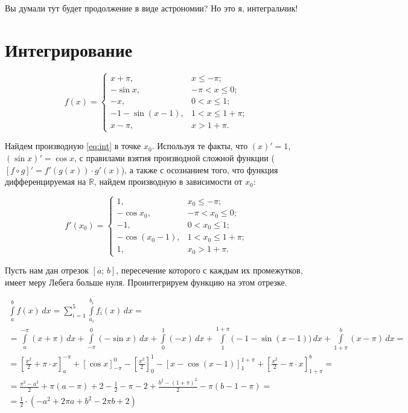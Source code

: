 \documentclass[12pt]{article}
\numberwithin{equation}{section} %
\theoremstyle{definition}\newtheorem{defi}{Определение}
\begin{document}
Вы думали тут будет продолжение в виде астрономии? Но это я, интегральчик!

\section{Интегрирование}

\begin{equation} \label{eq:int}
f(x) = \begin{cases}
  x + \pi, & x \leq -\pi;\\
  -\sin x, & -\pi < x \leq 0;\\
  -x, & 0 < x \leq 1;\\
  -1 -\sin (x - 1), & 1 < x \leq 1 + \pi;\\
  x - \pi, & x > 1 + \pi.
\end{cases}
\end{equation}

Найдем производную \eqref{eq:int} в точке $x_0$. Используя те факты, что $(x)' = 1$, $(\sin x)' = \cos x$, с правилами взятия производной сложной функции \big($[f \circ g]' = f'(g(x)) \cdot g'(x)$\big), а также с осознанием того, что функция дифференцируемая на $\mathbb{R}$, найдем производную в зависимости от $x_0$:

\begin{equation} \label{eq:int_der}
f'(x_0) = \begin{cases}
  1, & x_0 \leq -\pi;\\
  -\cos x_0, & -\pi < x_0 \leq 0;\\
  -1, & 0 < x_0 \leq 1;\\
  -\cos (x_0 - 1), & 1 < x_0 \leq 1 + \pi;\\
  1, & x_0 > 1 + \pi.
\end{cases}
\end{equation}

Пусть нам дан отрезок $[a;\,b]$, пересечение которого с каждым их промежутков, имеет меру Лебега больше нуля. Проинтегрируем функцию на этом отрезке.

\begin{multline}
  \int \limits_a^b f(x)\,dx = \sum \limits_{i = 1}^5 \int \limits_{a_i}^{b_i} f_i(x)\,dx = \\
  = \int \limits_a^{-\pi}(x + \pi)\,dx + \int \limits_{-\pi}^{0}(-\sin x)\,dx + \int \limits_0^1 (-x)\,dx + \int \limits_1^{1 + \pi} \big(-1 - \sin(x - 1) \big)\,dx + \int \limits_{1 + \pi}^b (x - \pi)\,dx = \\
  = \left[\frac{x^2}{2} + \pi \cdot x \right]_a^{-\pi} 
  + \left[\cos x \right]_{-\pi}^{0}
  - \left[\frac{x^2}{2} \right]_{0}^{1}
  - \left[x - \cos(x - 1) \right]_{1}^{1 + \pi}
  + \left[\frac{x^2}{2} - \pi \cdot x \right]_{1 + \pi}^{b} =\\
  = \frac{\pi^2 - a^2}{2} + \pi(a - \pi) + 2 - \frac{1}{2} - \pi - 2 + \frac{b^2 - (1 + \pi)^2}{2} - \pi(b - 1 - \pi) =\\
  = \frac{1}{2} \cdot \left( -a^2 + 2\pi a + b^2 - 2\pi b + 2 \right)
\end{multline}
\end{document}
